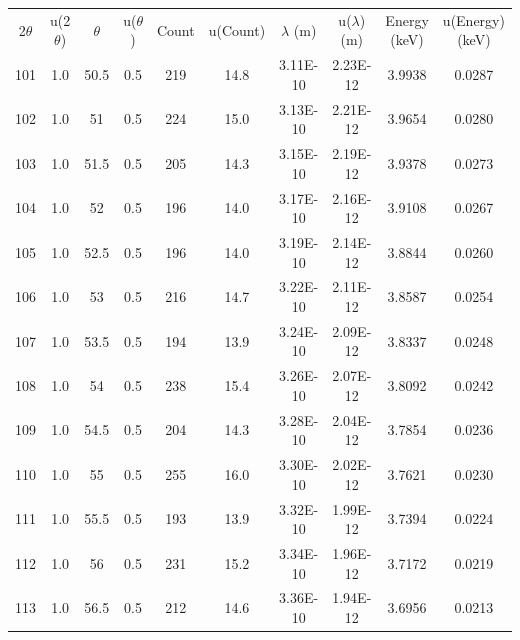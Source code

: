 \begin{maintable}[ht]
\center
\begin{tabular}{cccccccccc}
\multicolumn{1}{c}{2$\theta$} & \multicolumn{1}{c}{u(2$\theta$)} & \multicolumn{1}{c}{$\theta$} & \multicolumn{1}{c}{u($\theta$)} & \multicolumn{1}{c}{Count} & \multicolumn{1}{c}{u(Count)} & \multicolumn{1}{c}{$\lambda$ (m)} & \multicolumn{1}{c}{u($\lambda$) (m)} & \multicolumn{1}{c}{Energy (keV)} & \multicolumn{1}{c}{u(Energy) (keV)} \\
101         & 1.0   & 50.5       & 0.5           & 219     & 14.8       & 3.11E-10    & 2.23E-12       & 3.9938    & 0.0287       \\
102         & 1.0   & 51         & 0.5           & 224     & 15.0       & 3.13E-10    & 2.21E-12       & 3.9654    & 0.0280       \\
103         & 1.0   & 51.5       & 0.5           & 205     & 14.3       & 3.15E-10    & 2.19E-12       & 3.9378    & 0.0273       \\
104         & 1.0   & 52         & 0.5           & 196     & 14.0       & 3.17E-10    & 2.16E-12       & 3.9108    & 0.0267       \\
105         & 1.0   & 52.5       & 0.5           & 196     & 14.0       & 3.19E-10    & 2.14E-12       & 3.8844    & 0.0260       \\
106         & 1.0   & 53         & 0.5           & 216     & 14.7       & 3.22E-10    & 2.11E-12       & 3.8587    & 0.0254       \\
107         & 1.0   & 53.5       & 0.5           & 194     & 13.9       & 3.24E-10    & 2.09E-12       & 3.8337    & 0.0248       \\
108         & 1.0   & 54         & 0.5           & 238     & 15.4       & 3.26E-10    & 2.07E-12       & 3.8092    & 0.0242       \\
109         & 1.0   & 54.5       & 0.5           & 204     & 14.3       & 3.28E-10    & 2.04E-12       & 3.7854    & 0.0236       \\
110         & 1.0   & 55         & 0.5           & 255     & 16.0       & 3.30E-10    & 2.02E-12       & 3.7621    & 0.0230       \\
111         & 1.0   & 55.5       & 0.5           & 193     & 13.9       & 3.32E-10    & 1.99E-12       & 3.7394    & 0.0224       \\
112         & 1.0   & 56         & 0.5           & 231     & 15.2       & 3.34E-10    & 1.96E-12       & 3.7172    & 0.0219       \\
113         & 1.0   & 56.5       & 0.5           & 212     & 14.6       & 3.36E-10    & 1.94E-12       & 3.6956    & 0.0213       \\

\end{tabular}
\end{maintable}
